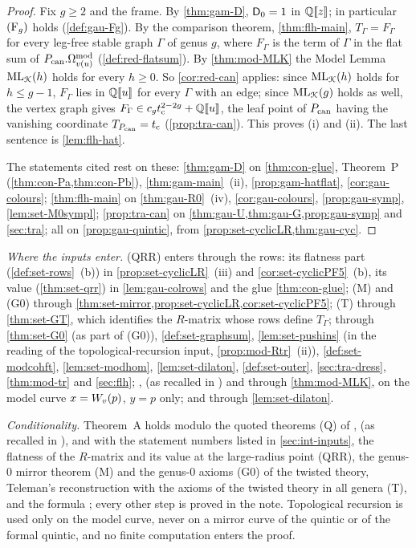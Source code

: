 \begin{proof}
Fix $g\geq2$ and the frame. By \cref{thm:gam-D}, $\mathsf{D}_0=1$ in $\mathbb{Q}[\![ z ]\!]$; in particular $(\mathrm{F}_{g})$ holds (\cref{def:gau-Fg}). By the comparison theorem, \cref{thm:flh-main}, $T_\Gamma=F_\Gamma$ for every leg-free stable graph $\Gamma$ of genus $g$, where $F_\Gamma$ is the term of $\Gamma$ in the flat sum of $P_{\mathrm{can}}.\Omega^{\mathrm{mod}}_{v(u)}$ (\cref{def:red-flatsum}). By \cref{thm:mod-MLK} the Model Lemma $\mathrm{ML}_{\mathcal{K}}(h)$ holds for every $h\geq0$. So \cref{cor:red-can} applies: since $\mathrm{ML}_{\mathcal{K}}(h)$ holds for $h\leq g-1$, $F_\Gamma$ lies in $\mathbb{Q}[\![ u ]\!]$ for every $\Gamma$ with an edge; since $\mathrm{ML}_{\mathcal{K}}(g)$ holds as well, the vertex graph gives $F_\Gamma\in c_gt_{\mathrm{c}}^{2-2g}+\mathbb{Q}[\![ u ]\!]$, the leaf point of $P_{\mathrm{can}}$ having the vanishing coordinate $T_{P_{\mathrm{can}}}=t_{\mathrm{c}}$ (\cref{prop:tra-can}). This proves (i) and (ii). The last sentence is \cref{lem:flh-hat}.

The statements cited rest on these: \cref{thm:gam-D} on \cref{thm:con-glue}, Theorem~P (\cref{thm:con-Pa,thm:con-Pb}), \cref{thm:gam-main}~(ii), \cref{prop:gam-hatflat}, \cref{cor:gau-colours}; \cref{thm:flh-main} on \cref{thm:gau-R0}~(iv), \cref{cor:gau-colours}, \cref{prop:gau-symp}, \cref{lem:set-M0sympl}; \cref{prop:tra-can} on \cref{thm:gau-U,thm:gau-G,prop:gau-symp} and \cref{sec:tra}; all on \cref{prop:gau-quintic}, from \cref{prop:set-cyclicLR,thm:gau-cyc}.
\end{proof}

\emph{Where the inputs enter.} (QRR) enters through the rows: its flatness part (\cref{def:set-rows}~(b)) in \cref{prop:set-cyclicLR}~(iii) and \cref{cor:set-cyclicPF5}~(b), its value (\cref{thm:set-qrr}) in \cref{lem:gau-colrows} and the glue \cref{thm:con-glue}; (M) and (G0) through \cref{thm:set-mirror,prop:set-cyclicLR,cor:set-cyclicPF5}; (T) through \cref{thm:set-GT}, which identifies the $R$-matrix whose rows define $T_\Gamma$; \cite{PPZ15} through \cref{thm:set-G0} (as part of (G0)), \cref{def:set-graphsum}, \cref{lem:set-pushins} (in the reading of the topological-recursion input, \cref{prop:mod-Rtr}~(ii)), \cref{def:set-modcohft}, \cref{lem:set-modhom}, \cref{lem:set-dilaton}, \cref{def:set-outer}, \cref{sec:tra-dress}, \cref{thm:mod-tr} and \cref{sec:flh}; \cite{Eynard:2007kz}, \cite{DuninBarkowski:2012bw} (as recalled in \cite{Dunin-Barkowski:2015caa}) and \cite{ABDKS25} through \cref{thm:mod-MLK}, on the model curve $x=W_{v}(p)$, $y=p$ only; and \cite[(1.7)]{AC96} through \cref{lem:set-dilaton}.

\emph{Conditionality.} Theorem~A holds modulo the quoted theorems (Q) of \cite{Eynard:2007kz}, \cite{DuninBarkowski:2012bw} (as recalled in \cite{Dunin-Barkowski:2015caa}), \cite{ABDKS25} and \cite{PPZ15} with the statement numbers listed in \cref{sec:int-inputs}, the flatness of the $R$-matrix and its value at the large-radius point (QRR), the genus-$0$ mirror theorem (M) and the genus-$0$ axioms (G0) of the twisted theory, Teleman's reconstruction with the axioms of the twisted theory in all genera (T), and the formula \cite[(1.7)]{AC96}; every other step is proved in the note. Topological recursion is used only on the model curve, never on a mirror curve of the quintic or of the formal quintic, and no finite computation enters the proof.

